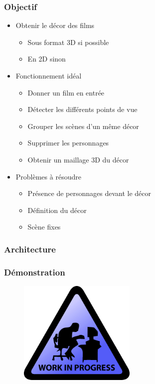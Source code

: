  \begin{frame}
   \frametitle{Objectif}
   
   \begin{itemize}
   \item Obtenir le décor des films
   	\begin{itemize}
   	\item Sous format 3D si possible
   	\item En 2D sinon
   	\end{itemize}
   	
   \item Fonctionnement idéal
   	\begin{itemize}
   	\item Donner un film en entrée
   	\item Détecter les différents points de vue
   	\item Grouper les scènes d'un même décor
   	\item Supprimer les personnages
   	\item Obtenir un maillage 3D du décor
   	\end{itemize}
   
   \item Problèmes à résoudre
  	\begin{itemize}
	\item Présence de personnages devant le décor
	\item Définition du décor
	\item Scène fixes
  	\end{itemize}

   \end{itemize}
	
 \end{frame}
 
\begin{frame}
  \frametitle{Architecture}

\end{frame}


 \begin{frame}
   \frametitle{Démonstration}
   \begin{figure}
   \includegraphics[width=0.5\textwidth]{Fig/workInProgress.png}
   \end{figure}

 \end{frame}